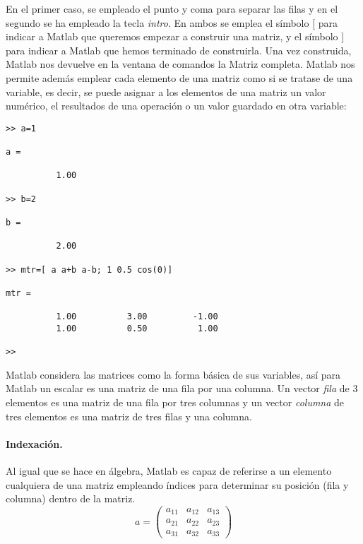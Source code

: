 En el primer caso, se empleado el punto y coma para separar las filas y en el segundo se ha empleado la tecla \emph{intro}.  En ambos se emplea el símbolo $[$ para indicar a Matlab que queremos empezar a construir una matriz, y el símbolo $]$ para indicar a Matlab que hemos terminado de construirla. Una vez construida, Matlab nos devuelve en la ventana de comandos la Matriz completa. Matlab nos permite además emplear cada elemento de una matriz como si se tratase de una variable, es decir, se puede asignar  a los elementos de una matriz un valor numérico, el resultados de una operación o un valor guardado en otra variable:
\begin{verbatim}
>> a=1

a =

          1.00

>> b=2

b =

          2.00

>> mtr=[ a a+b a-b; 1 0.5 cos(0)]

mtr =

          1.00          3.00         -1.00
          1.00          0.50          1.00

>> 
\end{verbatim}

Matlab considera las matrices como la forma básica de sus variables, así para Matlab un escalar es una matriz de una fila por una columna. Un vector \emph{fila} de 3 elementos es una matriz de una fila por tres columnas y un vector \emph{columna} de tres elementos es una matriz de tres filas y una columna.

\paragraph*{Indexación.} Al igual que se hace en álgebra, Matlab es capaz de referirse a un elemento cualquiera de una matriz empleando índices para determinar su posición (fila y columna) dentro de la matriz.
\begin{equation*}
a=
\begin{pmatrix}
a_{11}&a_{12}&a_{13}\\
a_{21}&a_{22}&a_{23}\\
a_{31}&a_{32}&a_{33}
\end{pmatrix}
\end{equation*}

